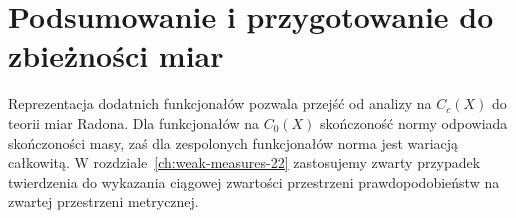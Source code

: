 \section{Podsumowanie i przygotowanie do zbieżności miar}
Reprezentacja dodatnich funkcjonałów pozwala przejść
od analizy na $C_c(X)$ do teorii miar Radona. Dla
funkcjonałów na $C_0(X)$ skończoność normy odpowiada
skończoności masy, zaś dla zespolonych funkcjonałów
norma jest wariacją całkowitą. W rozdziale~\ref{ch:weak-measures-22}
zastosujemy zwarty przypadek twierdzenia do wykazania
ciągowej zwartości przestrzeni prawdopodobieństw na
zwartej przestrzeni metrycznej.
